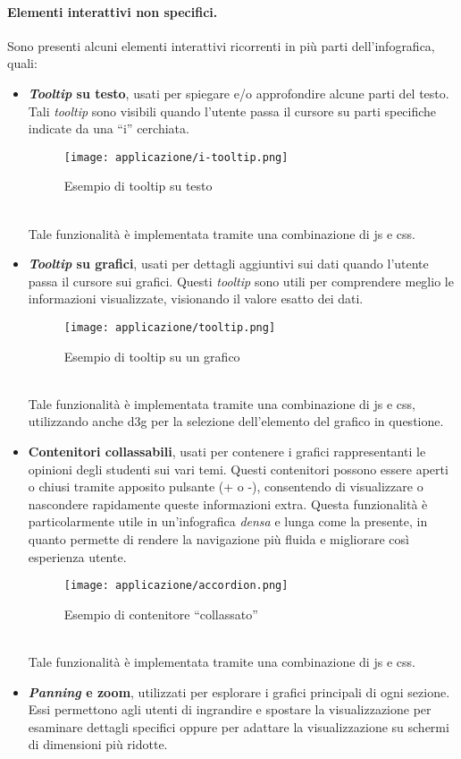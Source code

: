 \paragraph{Elementi interattivi non specifici.}
Sono presenti alcuni elementi interattivi ricorrenti in più parti dell'infografica, quali:
\begin{itemize}
    \item \textbf{\emph{Tooltip} su testo}, usati per spiegare e/o approfondire alcune parti del testo. Tali \emph{tooltip}
    sono visibili quando l'utente passa il cursore su parti specifiche indicate da una ``i'' cerchiata.
    \begin{figure}[h]
        \centering
        \texttt{[image: applicazione/i-tooltip.png]}
        \caption{Esempio di tooltip su testo}
        \label{fig:app_i-tooltip}
    \end{figure}
    \\Tale funzionalità è implementata tramite una combinazione di \gls{js} e \gls{css}.
    \item \textbf{\emph{Tooltip} su grafici}, usati per dettagli aggiuntivi sui dati quando l'utente passa il cursore sui grafici. 
    Questi \emph{tooltip} sono utili per comprendere meglio le informazioni visualizzate, visionando il valore esatto dei dati.
    \begin{figure}[h]
        \centering
        \texttt{[image: applicazione/tooltip.png]}
        \caption{Esempio di tooltip su un grafico}
        \label{fig:app_tooltip}
    \end{figure}
    \\Tale funzionalità è implementata tramite una combinazione di \gls{js} e \gls{css}, utilizzando anche \gls{d3g} per la selezione dell'elemento del grafico in questione.
    \item \textbf{Contenitori collassabili}, usati per contenere i grafici rappresentanti le opinioni degli studenti sui vari temi. Questi contenitori 
    possono essere aperti o chiusi tramite apposito pulsante (+ o -), consentendo di visualizzare o nascondere rapidamente queste informazioni extra.
    Questa funzionalità è particolarmente utile in un'infografica \emph{densa} e lunga come la presente, in quanto permette di rendere la navigazione più fluida e 
    migliorare così esperienza utente.
    \begin{figure}[h]
        \centering
        \texttt{[image: applicazione/accordion.png]}
        \caption{Esempio di contenitore ``collassato''}
        \label{fig:app_accordion}
    \end{figure}
    \\Tale funzionalità è implementata tramite una combinazione di \gls{js} e \gls{css}.
    \item \textbf{\emph{Panning} e zoom}, utilizzati per esplorare i grafici principali di ogni sezione. Essi permettono agli utenti di ingrandire e spostare la visualizzazione 
    per esaminare dettagli specifici oppure per adattare la visualizzazione su schermi di dimensioni più ridotte. 
    

\end{itemize}
